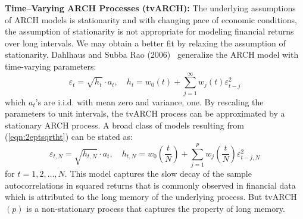 \noindent \textbf{Time--Varying ARCH Processes (tvARCH):} The underlying assumptions of ARCH models is stationarity and with changing pace of economic conditions, the assumption of stationarity is not appropriate for modeling financial returns over long intervals. We may obtain a better fit by relaxing the assumption of stationarity. Dahlhaus and Subba Rao (2006)~\cite{dahlhaus2006} generalize the ARCH model with time-varying parameters:
	\begin{equation}\label{eqn:2eptsqrtht}
	\varepsilon_t = \sqrt{h_t}\cdot a_t,\quad h_t = w_0(t) + \sum_{j=1}^{\infty}w_j(t)\varepsilon_{t-j}^2
	\end{equation}
which $a_t$'s are i.i.d. with mean zero and variance, one. By rescaling the parameters to unit intervals, the tvARCH process can be approximated by a stationary ARCH process. A broad class of models resulting from (\ref{eqn:2eptsqrtht}) can be stated as:
	\begin{equation}\label{eqn:2eptN}
	\varepsilon_{t,N} = \sqrt{h_{t,N}}\cdot a_t,\quad h_{t,N} = w_0\left(\frac{t}{N}\right) + \sum_{j=1}^pw_j \left(\frac{t}{N}\right) \varepsilon_{t-j,N}^2
	\end{equation}
for $t= 1,2,\ldots,N$. This model captures the slow decay of the sample autocorrelations in squared returns that is commonly observed in financial data which is attributed to the long memory of the underlying process. But tvARCH$(p)$ is a non-stationary process that captures the property of long memory.


